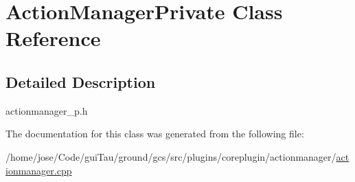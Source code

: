 \hypertarget{class_action_manager_private}{\section{Action\-Manager\-Private Class Reference}
\label{class_action_manager_private}
}


\subsection{Detailed Description}
actionmanager\-\_\-p.\-h 

The documentation for this class was generated from the following file\-:\begin{DoxyCompactItemize}
\item 
/home/jose/\-Code/gui\-Tau/ground/gcs/src/plugins/coreplugin/actionmanager/\hyperlink{actionmanager_8cpp}{actionmanager.\-cpp}\end{DoxyCompactItemize}
